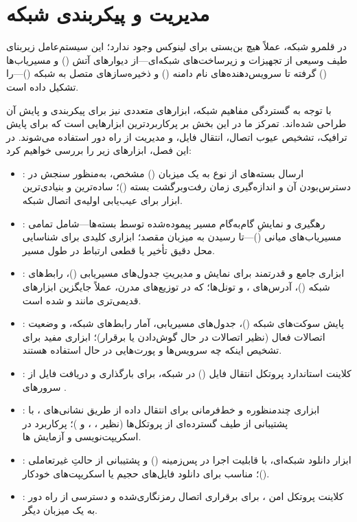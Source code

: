 \chapter{مدیریت و پیکربندی شبکه}

در قلمرو شبکه، عملاً هیچ بن‌بستی برای لینوکس وجود ندارد؛ این سیستم‌عامل زیربنای طیف وسیعی از تجهیزات و زیرساخت‌های شبکه‌ای—از دیوارهای آتش () و مسیریاب‌ها () گرفته تا سرویس‌دهنده‌های نام دامنه () و ذخیره‌سازهای متصل به شبکه ()—را تشکیل داده است.

با توجه به گستردگی مفاهیم شبکه، ابزارهای متعددی نیز برای پیکربندی و پایش آن طراحی شده‌اند. تمرکز ما در این بخش بر پرکاربردترین ابزارهایی است که برای پایش ترافیک، تشخیص عیوب اتصال، انتقال فایل، و مدیریت از راه دور استفاده می‌شوند. در این فصل، ابزارهای زیر را بررسی خواهیم کرد:

\begin{itemize}
  \item {}: ارسال بسته‌های  از نوع  به یک میزبان () مشخص، به‌منظور سنجش در دسترس‌بودن آن و اندازه‌گیری زمان رفت‌وبرگشت بسته ()؛ ساده‌ترین و بنیادی‌ترین ابزار برای عیب‌یابی اولیه‌ی اتصال شبکه.
  \item {}: رهگیری و نمایشِ گام‌به‌گام مسیر پیموده‌شده توسط بسته‌ها—شامل تمامی مسیریاب‌های میانی ()—تا رسیدن به میزبان مقصد؛ ابزاری کلیدی برای شناسایی محل دقیق تأخیر یا قطعی ارتباط در طول مسیر.
  \item {}: ابزاری جامع و قدرتمند برای نمایش و مدیریتِ جدول‌های مسیریابی ()، رابط‌های شبکه ()، آدرس‌های ، و تونل‌ها؛ که در توزیع‌های مدرن، عملاً جایگزین ابزارهای قدیمی‌تری مانند  و  شده است.
  \item {}: پایش سوکت‌های شبکه ()، جدول‌های مسیریابی، آمار رابط‌های شبکه، و وضعیت اتصالات فعال (نظیر اتصالات در حال گوش‌دادن یا برقرار)؛ ابزاری مفید برای تشخیص اینکه چه سرویس‌ها و پورت‌هایی در حال استفاده هستند.
  \item {}: کلاینت استاندارد پروتکل انتقال فایل () در شبکه، برای بارگذاری و دریافت فایل از سرورهای .
  \item {}: ابزاری چندمنظوره و خط‌فرمانی برای انتقال داده از طریق نشانی‌های ، با پشتیبانی از طیف گسترده‌ای از پروتکل‌ها (نظیر ، ، و )؛ پرکاربرد در اسکریپت‌نویسی و آزمایش ها.
  \item {}: ابزار دانلود شبکه‌ای، با قابلیت اجرا در پس‌زمینه () و پشتیبانی از حالتِ غیرتعاملی ()؛ مناسب برای دانلود فایل‌های حجیم یا اسکریپت‌های خودکار.
  \item {}: کلاینت پروتکل امن ، برای برقراری اتصال رمزنگاری‌شده و دسترسی از راه دور به یک میزبان دیگر.
\end{itemize}

